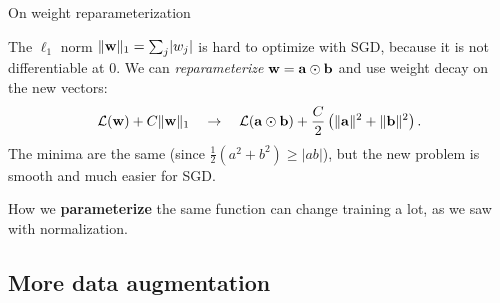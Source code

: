 \documentclass[11pt,aspectratio=169]{beamer}
\begin{document}
\begin{frame}{On weight reparameterization}
    \setlength{\parskip}{6pt}

    The $\ell_1$ norm $\lVert\boldsymbol{\mathbf{w}}\rVert_1 = \sum_j \lvert w_j \rvert$ is hard
    to optimize with SGD, because it is not differentiable at $0$. We can
    \textit{reparameterize} $\boldsymbol{\mathbf{w}} = \boldsymbol{\mathbf{a}} \odot \boldsymbol{\mathbf{b}}$ and use weight decay
    on the new vectors:
    \[
        \mathcal{L}(\boldsymbol{\mathbf{w}}) + C\lVert\boldsymbol{\mathbf{w}}\rVert_1
        \quad\rightarrow\quad
        \mathcal{L}(\boldsymbol{\mathbf{a}} \odot \boldsymbol{\mathbf{b}}) + \frac{C}{2}\left(\lVert\boldsymbol{\mathbf{a}}\rVert^2 + \lVert\boldsymbol{\mathbf{b}}\rVert^2\right) .
    \]
    The minima are the same (since $\tfrac12(a^2+b^2) \ge \lvert ab \rvert$),
    but the new problem is smooth and much easier for SGD.

    \begin{tcolorbox}[nndsgreen]
        How we \textbf{parameterize} the same function can change training a
        lot, as we saw with normalization.
    \end{tcolorbox}


\end{frame}

\subsection{More data augmentation}
\end{document}
